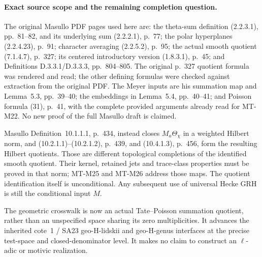 \documentclass[11pt,a4paper]{article}
\begin{document}
\paragraph{Exact source scope and the remaining completion question.}
The original Masullo PDF pages used here are: the theta-sum
definition (2.2.3.1), pp.~81--82, and its underlying sum (2.2.2.1),
p.~77; the polar hyperplanes (2.2.4.23), p.~91;
character averaging (2.2.5.2), p.~95; the actual smooth quotient
(7.1.4.7), p.~327; its centered introductory version (1.8.3.1),
p.~45; and Definitions D.3.3.1/D.3.3.3, pp.~804--805.
The original p.~327 quotient formula was rendered and read;
the other defining formulas were checked against extraction
from the original PDF. The Meyer inputs are his summation map
and Lemma~5.3, pp.~39--40; the embeddings in Lemma~5.4,
pp.~40--41; and Poisson formula (31), p.~41, with the complete
provided arguments already read for MT-M22. No new proof of
the full Masullo draft is claimed.

Masullo Definition~10.1.1.1, p.~434, instead closes
$M_a\Theta_\chi$ in a weighted Hilbert norm, and
(10.2.1.1)--(10.2.1.2), p.~439, and (10.4.1.3), p.~456,
form the resulting Hilbert quotients. Those are different
topological completions of the identified smooth quotient.
Their kernel, retained jets and trace-class properties must be
proved in that norm; MT-M25 and MT-M26 address those maps.
The quotient identification itself is unconditional. Any
subsequent use of universal Hecke GRH is still the conditional
input $M$.

The geometric crosswalk is now an actual Tate--Poisson
summation quotient, rather than an unspecified space sharing
its zero multiplicities. It advances the inherited cote~1 /
SA23 geo-H-lidskii and geo-H-genus interfaces at the precise
test-space and closed-denominator level. It makes no claim
to construct an $\ell$-adic or motivic realization.
\end{document}
